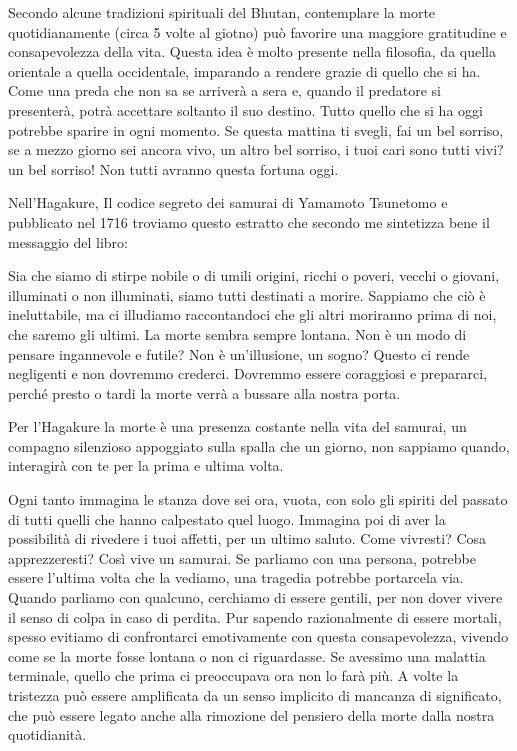 \documentclass[12pt]{book} %
\begin{document}
Secondo alcune tradizioni spirituali del Bhutan, contemplare la morte quotidianamente (circa 5 volte al giotno) può favorire una maggiore gratitudine e consapevolezza della vita. Questa idea è molto
presente nella filosofia, da quella orientale a quella occidentale, imparando a rendere grazie di quello che si ha.
Come una preda che non sa se arriverà a sera e, quando il predatore si presenterà, potrà accettare soltanto il suo
destino. Tutto quello che si ha oggi potrebbe sparire in ogni momento. 
Se questa mattina ti svegli, fai un bel sorriso, se a mezzo giorno sei ancora vivo, un altro bel sorriso, i tuoi cari sono tutti vivi? un bel sorriso! Non tutti avranno questa fortuna oggi.

Nell'Hagakure, Il codice segreto dei samurai di Yamamoto Tsunetomo e pubblicato nel
1716 troviamo questo
estratto che secondo me sintetizza bene il messaggio del libro:

Sia che siamo di stirpe nobile o di umili origini, ricchi o poveri, vecchi o giovani, illuminati o non illuminati, siamo
tutti destinati a morire. Sappiamo che ciò è ineluttabile, ma ci illudiamo raccontandoci che gli altri moriranno prima
di noi, che saremo gli ultimi. La morte sembra sempre lontana. Non è un modo di pensare ingannevole e futile? Non è
un'illusione, un sogno? Questo ci rende negligenti e non dovremmo crederci. Dovremmo essere coraggiosi e prepararci,
perché presto o tardi la morte verrà a bussare alla nostra porta.

Per l'Hagakure la morte è una presenza costante nella vita del samurai, un compagno silenzioso
appoggiato sulla spalla che un giorno, non sappiamo quando, interagirà con te per la prima e ultima volta. 

Ogni tanto immagina le stanza dove sei ora, vuota, con solo gli spiriti del passato di tutti quelli che hanno calpestato quel luogo. 
Immagina poi di aver la possibilità di rivedere i tuoi affetti, per un ultimo saluto. Come vivresti? Cosa apprezzeresti?
Così vive un samurai. Se parliamo con una persona, potrebbe essere l'ultima volta che la vediamo, una tragedia potrebbe
portarcela via. Quando parliamo con qualcuno, cerchiamo di essere gentili, per non dover vivere il
senso di colpa in caso di perdita.
Pur sapendo razionalmente di essere mortali, spesso evitiamo di confrontarci emotivamente con questa consapevolezza, vivendo come se la morte fosse lontana o non ci riguardasse. Se avessimo una malattia terminale, quello che prima ci preoccupava ora non lo farà più. 
A volte la tristezza può essere amplificata da un senso implicito di mancanza di significato, che può essere legato anche alla rimozione del pensiero della morte dalla nostra quotidianità.
\end{document}
